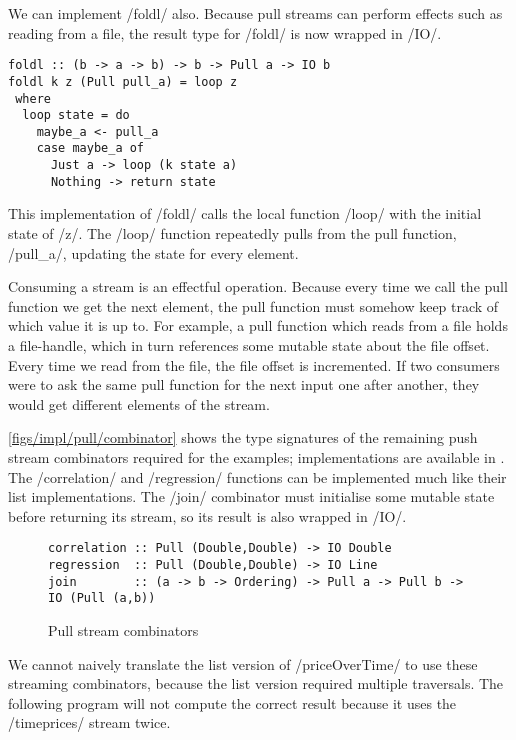 We can implement \Hs/foldl/ also.
Because pull streams can perform effects such as reading from a file, the result type for \Hs/foldl/ is now wrapped in \Hs/IO/.

\begin{lstlisting}
foldl :: (b -> a -> b) -> b -> Pull a -> IO b
foldl k z (Pull pull_a) = loop z
 where
  loop state = do
    maybe_a <- pull_a
    case maybe_a of
      Just a -> loop (k state a)
      Nothing -> return state
\end{lstlisting}

This implementation of \Hs/foldl/ calls the local function \Hs/loop/ with the initial state of \Hs/z/.
The \Hs/loop/ function repeatedly pulls from the pull function, \Hs/pull_a/, updating the state for every element.

Consuming a stream is an effectful operation.
Because every time we call the pull function we get the next element, the pull function must somehow keep track of which value it is up to.
For example, a pull function which reads from a file holds a file-handle, which in turn references some mutable state about the file offset.
Every time we read from the file, the file offset is incremented.
If two consumers were to ask the same pull function for the next input one after another, they would get different elements of the stream.


\autoref{figs/impl/pull/combinator} shows the type signatures of the remaining push stream combinators required for the examples; implementations are available in .
The \Hs/correlation/ and \Hs/regression/ functions can be implemented much like their list implementations.
The \Hs/join/ combinator must initialise some mutable state before returning its stream, so its result is also wrapped in \Hs/IO/.

\begin{figure}
\begin{lstlisting}
correlation :: Pull (Double,Double) -> IO Double
regression  :: Pull (Double,Double) -> IO Line
join        :: (a -> b -> Ordering) -> Pull a -> Pull b -> IO (Pull (a,b))
\end{lstlisting}
\caption{Pull stream combinators}
\label{figs/impl/pull/combinator}
\end{figure}

We cannot naively translate the list version of \Hs/priceOverTime/ to use these streaming combinators, because the list version required multiple traversals.
The following program will not compute the correct result because it uses the \Hs/timeprices/ stream twice.

